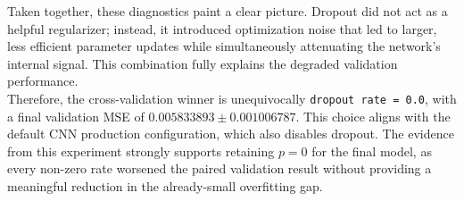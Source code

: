 Taken together, these diagnostics paint a clear picture. Dropout did not act as a helpful regularizer; instead, it introduced optimization noise that led to larger, less efficient parameter updates while simultaneously attenuating the network's internal signal. This combination fully explains the degraded validation performance.\\



Therefore, the cross-validation winner is unequivocally \texttt{dropout rate = 0.0}, with a final validation MSE of $0.005833893\pm0.001006787$. This choice aligns with the default CNN production configuration, which also disables dropout. The evidence from this experiment strongly supports retaining $p=0$ for the final model, as every non-zero rate worsened the paired validation result without providing a meaningful reduction in the already-small overfitting gap.

